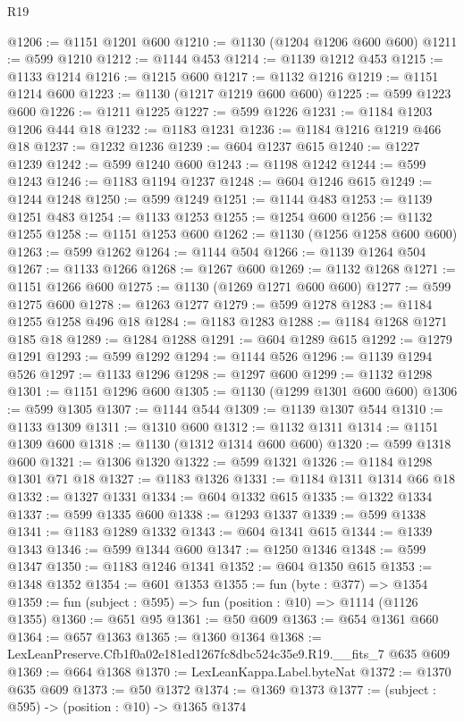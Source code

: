 \begin{lexlean}{R19}
\begin{coremodule}
@1206 := @1151 @1201 @600
@1210 := @1130 (@1204 @1206 @600 @600)
@1211 := @599 @1210
@1212 := @1144 @453
@1214 := @1139 @1212 @453
@1215 := @1133 @1214
@1216 := @1215 @600
@1217 := @1132 @1216
@1219 := @1151 @1214 @600
@1223 := @1130 (@1217 @1219 @600 @600)
@1225 := @599 @1223 @600
@1226 := @1211 @1225
@1227 := @599 @1226
@1231 := @1184 @1203 @1206 @444 @18
@1232 := @1183 @1231
@1236 := @1184 @1216 @1219 @466 @18
@1237 := @1232 @1236
@1239 := @604 @1237 @615
@1240 := @1227 @1239
@1242 := @599 @1240 @600
@1243 := @1198 @1242
@1244 := @599 @1243
@1246 := @1183 @1194 @1237
@1248 := @604 @1246 @615
@1249 := @1244 @1248
@1250 := @599 @1249
@1251 := @1144 @483
@1253 := @1139 @1251 @483
@1254 := @1133 @1253
@1255 := @1254 @600
@1256 := @1132 @1255
@1258 := @1151 @1253 @600
@1262 := @1130 (@1256 @1258 @600 @600)
@1263 := @599 @1262
@1264 := @1144 @504
@1266 := @1139 @1264 @504
@1267 := @1133 @1266
@1268 := @1267 @600
@1269 := @1132 @1268
@1271 := @1151 @1266 @600
@1275 := @1130 (@1269 @1271 @600 @600)
@1277 := @599 @1275 @600
@1278 := @1263 @1277
@1279 := @599 @1278
@1283 := @1184 @1255 @1258 @496 @18
@1284 := @1183 @1283
@1288 := @1184 @1268 @1271 @185 @18
@1289 := @1284 @1288
@1291 := @604 @1289 @615
@1292 := @1279 @1291
@1293 := @599 @1292
@1294 := @1144 @526
@1296 := @1139 @1294 @526
@1297 := @1133 @1296
@1298 := @1297 @600
@1299 := @1132 @1298
@1301 := @1151 @1296 @600
@1305 := @1130 (@1299 @1301 @600 @600)
@1306 := @599 @1305
@1307 := @1144 @544
@1309 := @1139 @1307 @544
@1310 := @1133 @1309
@1311 := @1310 @600
@1312 := @1132 @1311
@1314 := @1151 @1309 @600
@1318 := @1130 (@1312 @1314 @600 @600)
@1320 := @599 @1318 @600
@1321 := @1306 @1320
@1322 := @599 @1321
@1326 := @1184 @1298 @1301 @71 @18
@1327 := @1183 @1326
@1331 := @1184 @1311 @1314 @66 @18
@1332 := @1327 @1331
@1334 := @604 @1332 @615
@1335 := @1322 @1334
@1337 := @599 @1335 @600
@1338 := @1293 @1337
@1339 := @599 @1338
@1341 := @1183 @1289 @1332
@1343 := @604 @1341 @615
@1344 := @1339 @1343
@1346 := @599 @1344 @600
@1347 := @1250 @1346
@1348 := @599 @1347
@1350 := @1183 @1246 @1341
@1352 := @604 @1350 @615
@1353 := @1348 @1352
@1354 := @601 @1353
@1355 := fun (byte : @377) => @1354
@1359 := fun (subject : @595) => fun (position : @10) => @1114 (@1126 @1355)
@1360 := @651 @95
@1361 := @50 @609
@1363 := @654 @1361 @660
@1364 := @657 @1363
@1365 := @1360 @1364
@1368 := LexLeanPreserve.Cfb1f0a02e181ed1267fc8dbc524c35e9.R19.__fits_7 @635 @609
@1369 := @664 @1368
@1370 := LexLeanKappa.Label.byteNat
@1372 := @1370 @635 @609
@1373 := @50 @1372
@1374 := @1369 @1373
@1377 := (subject : @595) -> (position : @10) -> @1365 @1374

\end{coremodule}
\end{lexlean}

